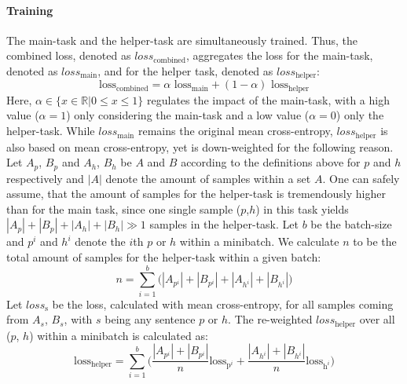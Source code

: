 \paragraph*{Training}
The main-task and the helper-task are simultaneously trained. Thus, the combined loss, denoted as $loss_\text{combined}$, aggregates the loss for the main-task, denoted as $loss_\text{main}$, and for the helper task, denoted as $loss_\text{helper}$:
\begin{equation}
\label{eq:multitask_aggregate}
\text{loss}_\text{combined} = \alpha \text{ loss}_\text{main} + (1 - \alpha)\text{ loss}_\text{helper}
\end{equation}
Here, $\alpha \in \{x \in \mathbb{R} | 0 \leq x \leq 1\}$ regulates the impact of the main-task, with a high value ($\alpha = 1$) only considering the main-task and a low value ($\alpha = 0$) only the helper-task. While $loss_\text{main}$ remains the original mean cross-entropy, $loss_\text{helper}$ is also based on mean cross-entropy, yet is down-weighted for the following reason. Let $A_p$, $B_p$ and $A_h$, $B_h$ be $A$ and $B$ according to the definitions above for $p$ and $h$ respectively and $|A|$ denote the amount of samples within a set $A$. One can safely assume, that the amount of samples for the helper-task is tremendously higher than for the main task, since one single sample ($p$,$h$) in this task yields $|A_p|+|B_p|+|A_h|+|B_h| \gg 1$ samples in the helper-task. Let $b$ be the batch-size and $p^i$ and $h^i$ denote the $i$th $p$ or $h$ within a minibatch. We calculate $n$ to be the total amount of samples for the helper-task within a given batch:
\begin{equation}
n = \sum^b_{i=1}\Big(|A_{p^i}|+|B_{p^i}|+|A_{h^i}|+|B_{h^i}|\Big)
\end{equation}
Let $loss_\text{s}$ be the loss, calculated with mean cross-entropy, for all samples coming from $A_s$, $B_s$, with $s$ being any sentence $p$ or $h$. The re-weighted $loss_\text{helper}$ over all ($p$, $h$) within a minibatch is calculated as:
\begin{equation}
\text{loss}_\text{helper} = \sum^b_{i=1}\bigg( \frac{|A_{p^i}| + |B_{p^i}|}{n} \text{loss}_{\text{p}^i} + \frac{|A_{h^i}| + |B_{h^i}|}{n} \text{loss}_{\text{h}^i} \bigg)
\end{equation}

